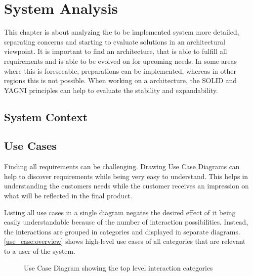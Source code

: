 
\chapter{System Analysis}

This chapter is about analyzing the to be implemented system more detailed, separating concerns and starting to evaluate solutions in an architectural viewpoint.
It is important to find an architecture, that is able to fulfill all requirements and is able to be evolved on for upcoming needs.
In some areas where this is foreseeable, preparations can be implemented, whereas in other regions this is not possible.
When working on a architecture, the SOLID and YAGNI principles can help to evaluate the stability and expandability.



\section{System Context}

\section{Use Cases}
Finding all requirements can be challenging.
Drawing Use Case Diagrams can help to discover requirements while being very easy to understand.
This helps in understanding the customers needs \cite{Rosenberg2007} while the customer receives an impression on what will be reflected in the final product.

Listing all use cases in a single diagram negates the desired effect of it being easily understandable because of the number of interaction possibilities.
Instead, the interactions are grouped in categories and displayed in separate diagrams.
\autoref{use_case:overview} shows high-level use cases of all categories that are relevant to a user of the system.

\begin{figure}[H]
	\centering
	\caption{Use Case Diagram showing the top level interaction categories}
	\label{use_case:overview}
\end{figure}

